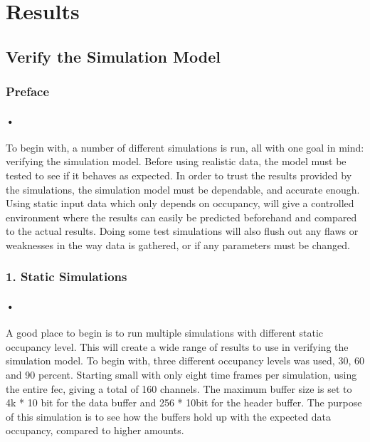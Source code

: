 \documentclass[a4paper, 12pt, openright, twoside]{report}
\begin{document}
\section{Results}

\subsection{Verify the Simulation Model}

\subsubsection{Preface}

\paragraph{•}
To begin with, a number of different simulations is run, all with one goal in mind: verifying the simulation model.
Before using realistic data, the model must be tested to see if it behaves as expected.
In order to trust the results provided by the simulations, the simulation model must be dependable, and accurate enough.
Using static input data which only depends on occupancy, will give a controlled environment where the results can easily be predicted beforehand and compared to the actual results.
Doing some test simulations will also flush out any flaws or weaknesses in the way data is gathered, or if any parameters must be changed.

\subsubsection{1. Static Simulations}
\paragraph{•}
A good place to begin is to run multiple simulations with different static occupancy level.
This will create a wide range of results to use in verifying the simulation model.
To begin with, three different occupancy levels was used, 30, 60 and 90 percent.
Starting small with only eight time frames per simulation, using the entire \gls{fec}, giving a total of 160 channels.
The maximum buffer size is set to 4k * 10 bit for the data buffer and 256 * 10bit for the header buffer.
The purpose of this simulation is to see how the buffers hold up with the expected data occupancy, compared to higher amounts.
\end{document}
